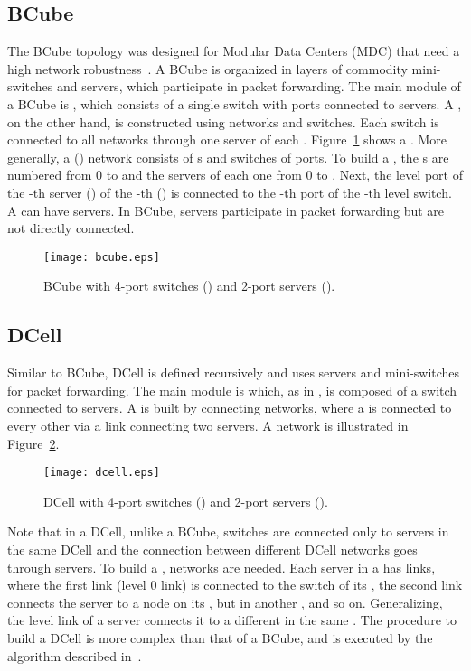 \subsection{BCube}
\label{bcube}

The BCube topology was designed for Modular Data Centers (MDC) that need a high network robustness~\cite{guo2009bcube}. A BCube is organized in layers of commodity mini-switches and servers, which participate in packet forwarding. The main module of a BCube is , which consists of a single switch with  ports connected to  servers.
A , on the other hand, is constructed using   networks and  switches. Each switch is connected to all  networks through one server of each .
Figure~\ref{fig:bcube} shows a . More generally, a  () network consists of  s and  switches of  ports.
To build a , the  s are numbered from 0 to  and the servers of each one from 0 to .
Next, the level  port of the -th server () of the -th  () is connected to the -th port of the -th level  switch.
A  can have  servers.
In BCube, servers participate in packet forwarding but are not directly connected.
\begin{figure}
\centering
\texttt{[image: bcube.eps]}
\caption{BCube with 4-port switches () and 2-port servers ().}
\label{fig:bcube}
\end{figure}

\subsection{DCell}
\label{dcell}

Similar to BCube, DCell is defined recursively and uses servers and mini-switches for packet forwarding.
The main module is  which, as in , is composed of a switch connected to  servers.
A  is built by connecting   networks, where a  is connected to every other  via a link connecting two servers.
A  network is illustrated in Figure~\ref{fig:dcell}.
\begin{figure}
\centering
\texttt{[image: dcell.eps]}
\caption{DCell with 4-port switches () and 2-port servers ().}
\label{fig:dcell}
\end{figure}

Note that in a DCell, unlike a BCube, switches are connected only to servers in the same DCell and the connection between different DCell
networks goes through servers. To build a ,   networks are needed. Each server in a  has  links, where the first link (level 0 link) is connected to the switch of its , the second link connects the server to a node on its , but in another , and so on. Generalizing, the level  link of a server connects it to a different  in the same . The procedure to build a DCell is more complex than that of a BCube, and is executed by the algorithm described in~\cite{guo2008dcell}.

